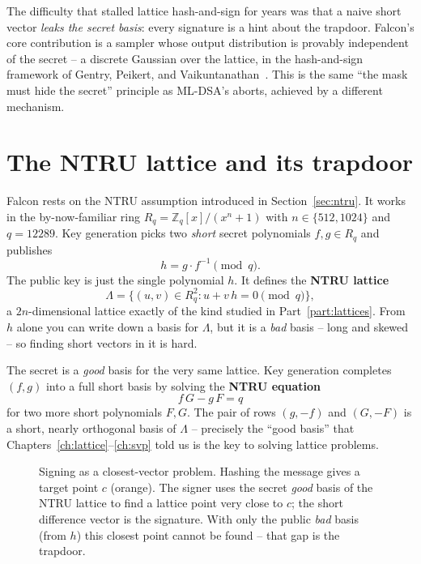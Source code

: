 The difficulty that stalled lattice hash-and-sign for years was that a naive short vector \emph{leaks the secret basis}: every signature is a hint about the trapdoor. Falcon's core contribution is a sampler whose output distribution is provably independent of the secret -- a discrete Gaussian over the lattice, in the hash-and-sign framework of Gentry, Peikert, and Vaikuntanathan~\cite{gpv2008}. This is the same ``the mask must hide the secret'' principle as ML-DSA's aborts, achieved by a different mechanism.

\section{The NTRU lattice and its trapdoor}

Falcon rests on the NTRU assumption introduced in Section~\ref{sec:ntru}. It works in the by-now-familiar ring $R_q = \mathbb{Z}_q[x]/(x^n+1)$ with $n \in \{512, 1024\}$ and $q = 12289$. Key generation picks two \emph{short} secret polynomials $f, g \in R_q$ and publishes
\[
h = g \cdot f^{-1} \pmod q.
\]
The public key is just the single polynomial $h$. It defines the \textbf{NTRU lattice}
\[
\Lambda = \{ (u, v) \in R_q^2 : u + v\,h = 0 \pmod q \},
\]
a $2n$-dimensional lattice exactly of the kind studied in Part~\ref{part:lattices}. From $h$ alone you can write down a basis for $\Lambda$, but it is a \emph{bad} basis -- long and skewed -- so finding short vectors in it is hard.

The secret is a \emph{good} basis for the very same lattice. Key generation completes $(f,g)$ into a full short basis by solving the \textbf{NTRU equation}
\[
f\,G - g\,F = q
\]
for two more short polynomials $F, G$. The pair of rows $(g, -f)$ and $(G, -F)$ is a short, nearly orthogonal basis of $\Lambda$ -- precisely the ``good basis'' that Chapters~\ref{ch:lattice}--\ref{ch:svp} told us is the key to solving lattice problems.

\begin{figure}[H]
\centering
{}
\caption{Signing as a closest-vector problem. Hashing the message gives a target point $c$ (orange). The signer uses the secret \emph{good} basis of the NTRU lattice to find a lattice point very close to $c$; the short difference vector is the signature. With only the public \emph{bad} basis (from $h$) this closest point cannot be found -- that gap is the trapdoor.}
\label{fig:falcon-cvp}
\end{figure}


